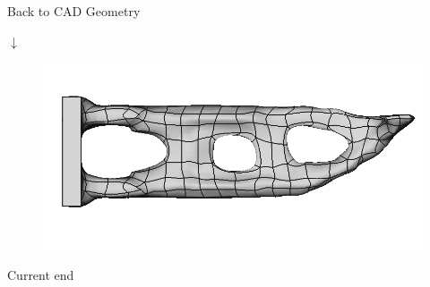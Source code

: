 \begin{frame}{Back to CAD Geometry}
\begin{minipage}[t]{0.45\linewidth}
\begin{figure}
		\end{figure}
		\vspace{-0.75cm}
		\begin{center}
			$\downarrow$
		\end{center}
		\vspace{-0.6cm}
		\begin{figure}
			\includegraphics[width=.88\textwidth]{Pictures/SecondHalf/Back2CAD3}
		\end{figure}
	\end{minipage}
\end{frame}

\begin{frame}
Current end
\end{frame}
